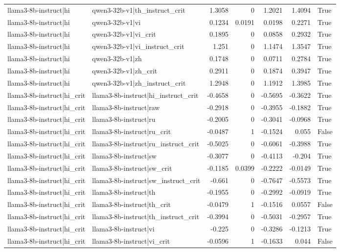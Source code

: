 \begin{table}
\begin{tabular}{l l r r r r l}
llama3-8b-instruct|hi & qwen3-32b-v1|th_instruct_crit & 1.3058 & 0 & 1.2021 & 1.4094 & True \\
llama3-8b-instruct|hi & qwen3-32b-v1|vi & 0.1234 & 0.0191 & 0.0198 & 0.2271 & True \\
llama3-8b-instruct|hi & qwen3-32b-v1|vi_crit & 0.1895 & 0 & 0.0858 & 0.2932 & True \\
llama3-8b-instruct|hi & qwen3-32b-v1|vi_instruct_crit & 1.251 & 0 & 1.1474 & 1.3547 & True \\
llama3-8b-instruct|hi & qwen3-32b-v1|zh & 0.1748 & 0 & 0.0711 & 0.2784 & True \\
llama3-8b-instruct|hi & qwen3-32b-v1|zh_crit & 0.2911 & 0 & 0.1874 & 0.3947 & True \\
llama3-8b-instruct|hi & qwen3-32b-v1|zh_instruct_crit & 1.2948 & 0 & 1.1912 & 1.3985 & True \\
llama3-8b-instruct|hi_crit & llama3-8b-instruct|hi_instruct_crit & -0.4658 & 0 & -0.5695 & -0.3622 & True \\
llama3-8b-instruct|hi_crit & llama3-8b-instruct|raw & -0.2918 & 0 & -0.3955 & -0.1882 & True \\
llama3-8b-instruct|hi_crit & llama3-8b-instruct|ru & -0.2005 & 0 & -0.3041 & -0.0968 & True \\
llama3-8b-instruct|hi_crit & llama3-8b-instruct|ru_crit & -0.0487 & 1 & -0.1524 & 0.055 & False \\
llama3-8b-instruct|hi_crit & llama3-8b-instruct|ru_instruct_crit & -0.5025 & 0 & -0.6061 & -0.3988 & True \\
llama3-8b-instruct|hi_crit & llama3-8b-instruct|sw & -0.3077 & 0 & -0.4113 & -0.204 & True \\
llama3-8b-instruct|hi_crit & llama3-8b-instruct|sw_crit & -0.1185 & 0.0399 & -0.2222 & -0.0149 & True \\
llama3-8b-instruct|hi_crit & llama3-8b-instruct|sw_instruct_crit & -0.661 & 0 & -0.7647 & -0.5573 & True \\
llama3-8b-instruct|hi_crit & llama3-8b-instruct|th & -0.1955 & 0 & -0.2992 & -0.0919 & True \\
llama3-8b-instruct|hi_crit & llama3-8b-instruct|th_crit & -0.0479 & 1 & -0.1516 & 0.0557 & False \\
llama3-8b-instruct|hi_crit & llama3-8b-instruct|th_instruct_crit & -0.3994 & 0 & -0.5031 & -0.2957 & True \\
llama3-8b-instruct|hi_crit & llama3-8b-instruct|vi & -0.225 & 0 & -0.3286 & -0.1213 & True \\
llama3-8b-instruct|hi_crit & llama3-8b-instruct|vi_crit & -0.0596 & 1 & -0.1633 & 0.044 & False \\

\end{tabular}
\end{table}
